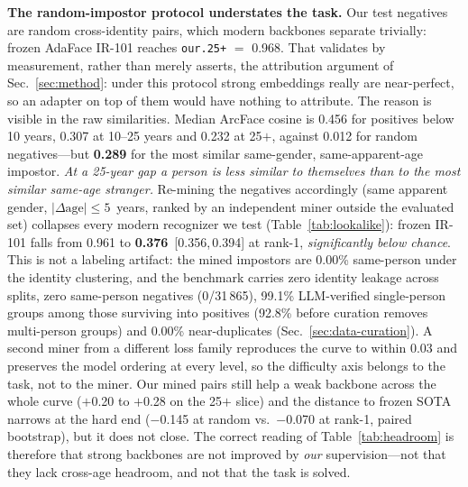 \documentclass[journal]{IEEEtran}
\begin{document}
\textbf{The random-impostor protocol understates the task.} Our test negatives are random cross-identity pairs, which modern backbones separate trivially: frozen AdaFace IR-101 reaches \texttt{our.25+} $=$ 0.968. That validates by measurement, rather than merely asserts, the attribution argument of Sec.~\ref{sec:method}: under this protocol strong embeddings really are near-perfect, so an adapter on top of them would have nothing to attribute. The reason is visible in the raw similarities. Median ArcFace cosine is 0.456 for positives below 10 years, 0.307 at 10--25 years and 0.232 at 25$+$, against 0.012 for random negatives---but \textbf{0.289} for the most similar same-gender, same-apparent-age impostor. \emph{At a 25-year gap a person is less similar to themselves than to the most similar same-age stranger.} Re-mining the negatives accordingly (same apparent gender, $|\Delta\text{age}|\leq5$~years, ranked by an independent miner outside the evaluated set) collapses every modern recognizer we test (Table~\ref{tab:lookalike}): frozen IR-101 falls from 0.961 to \textbf{0.376}~[0.356,\,0.394] at rank-1, \emph{significantly below chance}. This is not a labeling artifact: the mined impostors are 0.00\% same-person under the identity clustering, and the benchmark carries zero identity leakage across splits, zero same-person negatives (0/31\,865), 99.1\% LLM-verified single-person groups among those surviving into positives (92.8\% before curation removes multi-person groups) and 0.00\% near-duplicates (Sec.~\ref{sec:data-curation}). A second miner from a different loss family reproduces the curve to within 0.03 and preserves the model ordering at every level, so the difficulty axis belongs to the task, not to the miner. Our mined pairs still help a weak backbone across the whole curve ($+$0.20 to $+$0.28 on the 25$+$ slice) and the distance to frozen SOTA narrows at the hard end ($-$0.145 at random vs.\ $-$0.070 at rank-1, paired bootstrap), but it does not close. The correct reading of Table~\ref{tab:headroom} is therefore that strong backbones are not improved by \emph{our} supervision---not that they lack cross-age headroom, and not that the task is solved.
\end{document}
